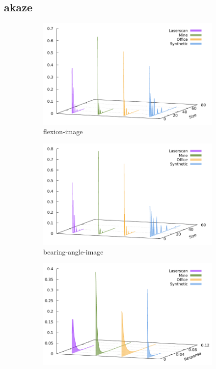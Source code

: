 \subsection{\acrshort{akaze}}\label{sec:akaze_stats}
\begin{figure}[H]
\begin{subfigure}[t]{0.45\linewidth}
    \includegraphics[width=\linewidth]{chapter06/results/AKAZE/flexion/size.pdf}%
    \caption{\gls{flexion-image}}
\end{subfigure}\quad
\begin{subfigure}[t]{0.45\linewidth}
    \includegraphics[width=\linewidth]{chapter06/results/AKAZE/bearing/size.pdf}
    \caption{\gls{bearing-angle-image}}
\end{subfigure}
\begin{subfigure}[t]{0.45\linewidth}
    \includegraphics[width=\linewidth]{chapter06/results/AKAZE/flexion/response.pdf}%

\end{subfigure}
\end{figure}
